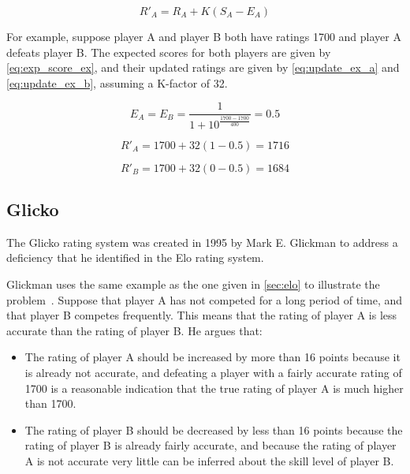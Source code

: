 \begin{equation} \label{eq:update}
R'_A = R_A + K \left( S_A - E_A \right)
\end{equation}

For example, suppose player A and player B both have ratings 1700 and player A defeats player B.
The expected scores for both players are given by \autoref{eq:exp_score_ex}, and their updated ratings are given by \autoref{eq:update_ex_a} and \autoref{eq:update_ex_b}, assuming a K-factor of 32.

\begin{equation} \label{eq:exp_score_ex}
E_A = E_B = \frac{1}{1 + 10^\frac{1700 - 1700}{400}} = 0.5
\end{equation}

\begin{equation} \label{eq:update_ex_a}
R'_A = 1700 + 32 \left( 1 - 0.5 \right) = 1716
\end{equation}

\begin{equation} \label{eq:update_ex_b}
R'_B = 1700 + 32 \left( 0 - 0.5 \right) = 1684
\end{equation}

\subsection{Glicko}
\label{sec:glicko}
The Glicko rating system was created in 1995 by Mark E. Glickman to address a deficiency that he identified in the Elo rating system.

Glickman uses the same example as the one given in \autoref{sec:elo} to illustrate the problem~\citep{glicko}.
Suppose that player A has not competed for a long period of time, and that player B competes frequently.
This means that the rating of player A is less accurate than the rating of player B.
He argues that:

\begin{itemize}
	\item{The rating of player A should be increased by more than 16 points because it is already not accurate, and defeating a player with a fairly accurate rating of 1700 is a reasonable indication that the true rating of player A is much higher than 1700.}
	\item{The rating of player B should be decreased by less than 16 points because the rating of player B is already fairly accurate, and because the rating of player A is not accurate very little can be inferred about the skill level of player B.}
\end{itemize}

